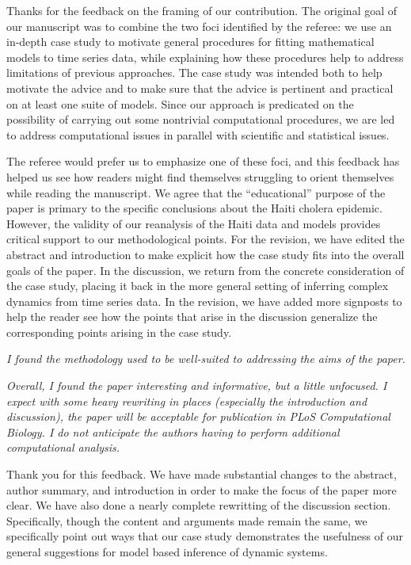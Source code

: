 \documentclass[11pt]{article}
\newcommand\report[1]{{\color{mygreen} \vspace{1mm}\hspace{0.25in}\parbox{6in}{\em #1}}}
\begin{document}
Thanks for the feedback on the framing of our contribution.
The original goal of our manuscript was to combine the two foci identified by the referee:
we use an in-depth case study to motivate general procedures for fitting mathematical models to time series data, while explaining how these procedures help to address limitations of previous approaches.
The case study was intended both to help motivate the advice and to make sure that the advice is pertinent and practical on at least one suite of models.
Since our approach is predicated on the possibility of carrying out some nontrivial computational procedures, we are led to address computational issues in parallel with scientific and statistical issues.

The referee would prefer us to emphasize one of these foci, and this feedback has helped us see how readers might find themselves struggling to orient themselves while reading the manuscript.
We agree that the ``educational'' purpose of the paper is primary to the specific conclusions about the Haiti cholera epidemic.
However, the validity of our reanalysis of the Haiti data and models provides critical support to our methodological points.
For the revision, we have edited the abstract and introduction to make explicit how the case study fits into the overall goals of the paper.
In the discussion, we return from the concrete consideration of the case study, placing it back in the more general setting of inferring complex dynamics from time series data.
In the revision, we have added more signposts to help the reader see how the points that arise in the discussion generalize the corresponding points arising in the case study.

\report{
  I found the methodology used to be well-suited to addressing the aims of the paper.
}

\report{
  Overall, I found the paper interesting and informative, but a little unfocused. I expect with some heavy rewriting in places (especially the introduction and discussion), the paper will be acceptable for publication in PLoS Computational Biology. I do not anticipate the authors having to perform additional computational analysis.
}

Thank you for this feedback.
We have made substantial changes to the abstract, author summary, and introduction in order to make the focus of the paper more clear. 
We have also done a nearly complete rewritting of the discussion section. 
Specifically, though the content and arguments made remain the same, we specifically point out ways that our case study demonstrates the usefulness of our general suggestions for model based inference of dynamic systems. 
\end{document}

